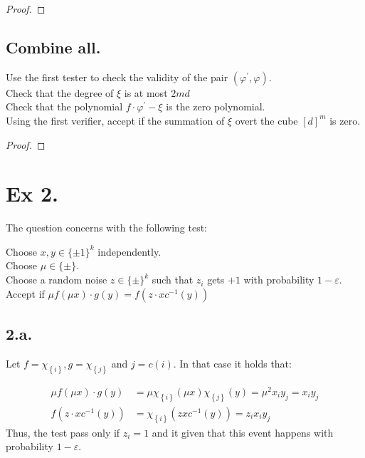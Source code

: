 \documentclass{article}
\newcommand{\Chi}[1]{\chi_{ \left\{ #1  \right\} } }
\begin{document}
\begin{proof}
\end{proof}

\subsection{Combine all.}
\begin{algorithm}[H]
  Use the first tester to check the validity of the pair $\left(\varphi^{\prime},\varphi\right)$. \\
  Check that the degree of $\xi$ is at most $2md$ \\ 
  Check that the polynomial $f\cdot \varphi^{\prime} - \xi$ is the zero polynomial. \\
  Using the first verifier, accept if the summation of $\xi$ overt the cube $[d]^{m}$ is zero.  
\end{algorithm}

\begin{proof}
\end{proof}

\section{Ex 2.}
The question concerns with the following test: 

\begin{algorithm}[H]
  Choose $x,y \in \{\pm1\}^{k}$ independently. \\
  Choose $\mu \in \{\pm\}$. \\ 
  Choose a random noise $z \in \{\pm\}^{k}$ such that $z_{i}$ gets $+1$ with probability $1-\varepsilon$.  \\
  Accept if $\mu f\left( \mu x \right) \cdot g\left( y \right) = f\left(z \cdot x c^{-1}\left( y \right)  \right)$

\end{algorithm}


\subsection{2.a.} Let $f = \Chi{i}, g = \Chi{j}$ and $j = c(i)$. In that case it holds that: 

\begin{equation*}
  \begin{split}
    \mu f\left( \mu x \right) \cdot g\left( y \right)  &= \mu \Chi{i}\left( \mu x \right)\Chi{j}\left( y \right) = \mu^{2}x_{i}y_{j} = x_{i}y_{j} \\ 
    f\left(z \cdot x c^{-1}\left( y \right)  \right) & = \Chi{i}\left( zx c^{-1}(y) \right) = z_{i}x_{i}y_{j} 
  \end{split}
\end{equation*}
Thus, the test pass only if $z_{i} = 1$ and it given that this event happens with probability $1-\varepsilon$. 
\end{document}
